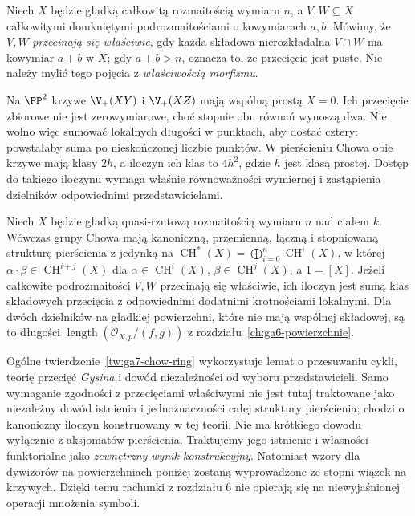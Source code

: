 \begin{definicja}
\label{def:ga7-proper-intersection}
Niech $X$ będzie gładką całkowitą rozmaitością wymiaru $n$,
a $V,W\subseteq X$ całkowitymi domkniętymi podrozmaitościami
o kowymiarach $a,b$. Mówimy, że $V,W$ \emph{przecinają się
właściwie}, gdy każda składowa nierozkładalna $V\cap W$
ma kowymiar $a+b$ w $X$; gdy $a+b>n$, oznacza to, że
przecięcie jest puste.
Nie należy mylić tego pojęcia z \emph{właściwością morfizmu}.
\end{definicja}

\begin{przyklad}
Na $\PP^2$ krzywe $\V_+(XY)$ i $\V_+(XZ)$
mają wspólną prostą $X=0$. Ich przecięcie zbiorowe
nie jest zerowymiarowe, choć stopnie obu równań wynoszą dwa.
Nie wolno więc sumować lokalnych długości w punktach,
aby dostać cztery: powstałaby suma po nieskończonej liczbie
punktów. W pierścieniu Chowa obie krzywe mają klasy $2h$,
a iloczyn ich klas to $4h^2$, gdzie $h$ jest klasą prostej.
Dostęp do takiego iloczynu wymaga właśnie równoważności
wymiernej i zastąpienia dzielników odpowiednimi przedstawicielami.
\end{przyklad}

\begin{twierdzenie}
\label{tw:ga7-chow-ring}
Niech $X$ będzie gładką quasi-rzutową rozmaitością
wymiaru $n$ nad ciałem $k$. Wówczas grupy Chowa mają kanoniczną, przemienną,
łączną i stopniowaną strukturę pierścienia z jedynką na
$\operatorname{CH}^*(X)=\bigoplus_{i=0}^n\operatorname{CH}^i(X)$,
w której $\alpha\cdot\beta\in\operatorname{CH}^{i+j}(X)$
dla $\alpha\in\operatorname{CH}^i(X)$,
$\beta\in\operatorname{CH}^j(X)$, a $1=[X]$.
Jeżeli całkowite podrozmaitości $V,W$ przecinają się
właściwie, ich iloczyn jest sumą klas składowych
przecięcia z odpowiednimi dodatnimi krotnościami
lokalnymi. Dla dwóch dzielników na gładkiej powierzchni,
które nie mają wspólnej składowej, są to długości
$\operatorname{length}(\mathcal O_{X,p}/(f,g))$ z
rozdziału~\ref{ch:ga6-powierzchnie}.
\end{twierdzenie}

\begin{uwaga}
\label{uw:ga7-moving-lemma}
Ogólne twierdzenie~\ref{tw:ga7-chow-ring} wykorzystuje
lemat o przesuwaniu cykli, teorię przecięć \emph{Gysina}
i dowód niezależności od wyboru przedstawicieli.
Samo wymaganie zgodności z przecięciami właściwymi nie jest
tutaj traktowane jako niezależny dowód istnienia i jednoznaczności
całej struktury pierścienia; chodzi o kanoniczny iloczyn
konstruowany w tej teorii.
Nie ma krótkiego dowodu wyłącznie z aksjomatów pierścienia.
Traktujemy jego istnienie i własności funktorialne jako
\emph{zewnętrzny wynik konstrukcyjny}. Natomiast wzory dla
dywizorów na powierzchniach poniżej zostaną wyprowadzone
ze stopni wiązek na krzywych. Dzięki temu
rachunki z rozdziału 6 nie opierają się na niewyjaśnionej
operacji mnożenia symboli.
\end{uwaga}


